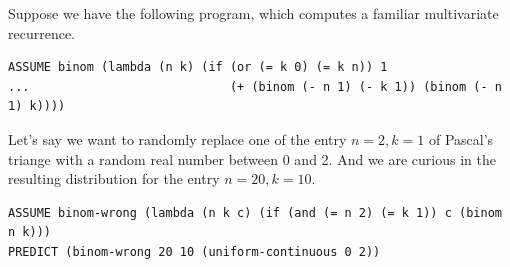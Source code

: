 \documentclass[10pt]{article}
\begin{document}
Suppose we have the following program, which computes a familiar multivariate recurrence.

\begin{leftbar} \begin{small} \begin{verbatim}
ASSUME binom (lambda (n k) (if (or (= k 0) (= k n)) 1 
...                            (+ (binom (- n 1) (- k 1)) (binom (- n 1) k)))) 
\end{verbatim} \end{small} \end{leftbar}

Let's say we want to randomly replace one of the entry $n=2, k=1$ of Pascal's triange with a random real number between 0 and 2.  And we are curious in the resulting distribution for the entry $n = 20, k = 10$. 

\begin{leftbar} \begin{small} \begin{verbatim}
ASSUME binom-wrong (lambda (n k c) (if (and (= n 2) (= k 1)) c (binom n k))) 
PREDICT (binom-wrong 20 10 (uniform-continuous 0 2))
\end{verbatim} \end{small} \end{leftbar}
\end{document}

